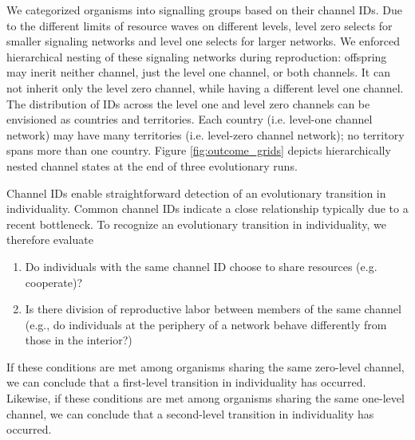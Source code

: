 We categorized organisms into signalling groups based on their channel IDs.
Due to the different limits of resource waves on different levels, level zero selects for smaller signaling networks and level one selects for larger networks.
We enforced hierarchical nesting of these signaling networks during reproduction:
offspring may inerit neither channel, just the level one channel, or both channels.  It can not inherit only the level zero channel, while having a different level one channel.
The distribution of IDs across the level one and level zero channels can be envisioned as countries and territories.  Each country (i.e. level-one channel network) may have many territories (i.e. level-zero channel network); no territory spans more than one country.
Figure \ref{fig:outcome_grids} depicts hierarchically nested channel states at the end of three evolutionary runs.

Channel IDs enable straightforward detection of an evolutionary transition in individuality.
Common channel IDs indicate a close relationship typically due to a recent bottleneck.  %
To recognize an evolutionary transition in individuality, we therefore evaluate
\begin{enumerate}
\item Do individuals with the same channel ID choose to share resources (e.g. cooperate)?
\item Is there division of reproductive labor between members of the same channel %
(e.g., do individuals at the periphery of a network behave differently from those in the interior?)
\end{enumerate}
If these conditions are met among organisms sharing the same zero-level channel, we can conclude that a first-level transition in individuality has occurred.
Likewise, if these conditions are met among organisms sharing the same one-level channel, we can conclude that a second-level transition in individuality has occurred.

